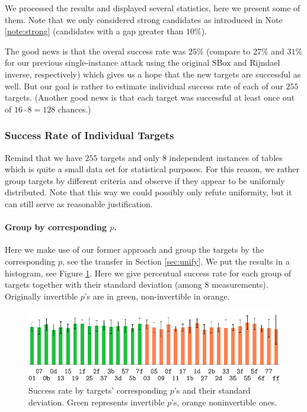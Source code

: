 We processed the results and displayed several statistics, here we present some of them. Note that we only considered strong candidates as introduced in Note \ref{note:strong} (candidates with a gap greater than $10\%$).

The good news is that the overal success rate was $25\%$ (compare to $27\%$ and $31\%$ for our previous single-instance attack using the original SBox and Rijndael inverse, respectively) which gives us a hope that the new targets are successful as well. But our goal is rather to estimate individual success rate of each of our $255$ targets. (Another good news is that each target was successful at least once out of $16\cdot8=128$ chances.)

\subsubsection{Success Rate of Individual Targets}
	
	Remind that we have $255$ targets and only $8$ independent instances of tables which is quite a small data set for statistical purposes. For this reason, we rather group targets by different criteria and observe if they appear to be uniformly distributed. Note that this way we could possibly only refute uniformity, but it can still serve as reasonable justification.
	
	\paragraph{Group by corresponding $p$.}
	
	
	Here we make use of our former approach and group the targets by the corresponding $p$, see the transfer in Section \ref{sec:unify}. We put the results in a histogram, see Figure \ref{fig:leaktargethist}. Here we give percentual success rate for each group of targets together with their standard deviation (among $8$ measurements). Originally invertible $p$'s are in green, non-invertible in orange.
	
	\begin{figure}[h]
	\begin{center}
		\includegraphics{figures/leak_target/leak_target.pdf}
		\caption{Success rate by targets' corresponding $p$'s and their standard deviation. Green represents invertible $p$'s, orange noninvertible ones.}
		\label{fig:leaktargethist}
	\end{center}
	\end{figure}
	
